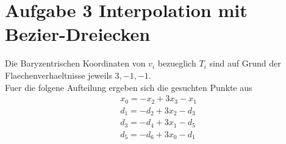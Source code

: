 
\section*{Aufgabe 3 Interpolation mit Bezier-Dreiecken}
Die Baryzentrischen Koordinaten von $v_i$ bezueglich $T_i$ sind auf Grund der Flaechenverhaeltnisse jeweils $3, -1, -1$.\\
Fuer die folgene Aufteilung ergeben sich die gesuchten Punkte aus
\begin{align}
 	x_0 = -x_2 + 3x_3 - x_1 \\
 	d_1 = -d_2 + 3x_2 - d_3 \\
 	d_3 = -d_4 + 3x_1 - d_5 \\
 	d_5 = -d_6 + 3x_0 - d_1 
\end{align}